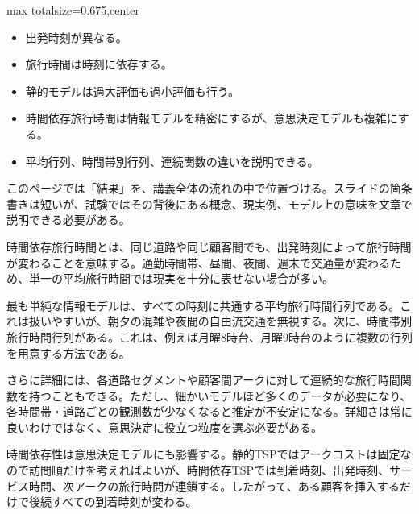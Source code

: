 \clearpage
{}
\begin{adjustbox}{max totalsize={\textwidth}{0.675\textheight},center}
\begin{minipage}{\textwidth}\scriptsize
\begin{minipage}[t]{0.485\textwidth}
\begin{itemize}
\item 出発時刻が異なる。
\item 旅行時間は時刻に依存する。
\item 静的モデルは過大評価も過小評価も行う。
\end{itemize}
\begin{itemize}
\item 時間依存旅行時間は情報モデルを精密にするが、意思決定モデルも複雑にする。
\item 平均行列、時間帯別行列、連続関数の違いを説明できる。
\end{itemize}
\end{minipage}\hfill
\begin{minipage}[t]{0.485\textwidth}
このページでは「結果」を、講義全体の流れの中で位置づける。スライドの箇条書きは短いが、試験ではその背後にある概念、現実例、モデル上の意味を文章で説明できる必要がある。\par
時間依存旅行時間とは、同じ道路や同じ顧客間でも、出発時刻によって旅行時間が変わることを意味する。通勤時間帯、昼間、夜間、週末で交通量が変わるため、単一の平均旅行時間では現実を十分に表せない場合が多い。\par
最も単純な情報モデルは、すべての時刻に共通する平均旅行時間行列である。これは扱いやすいが、朝夕の混雑や夜間の自由流交通を無視する。次に、時間帯別旅行時間行列がある。これは、例えば月曜8時台、月曜9時台のように複数の行列を用意する方法である。\par
さらに詳細には、各道路セグメントや顧客間アークに対して連続的な旅行時間関数を持つこともできる。ただし、細かいモデルほど多くのデータが必要になり、各時間帯・道路ごとの観測数が少なくなると推定が不安定になる。詳細さは常に良いわけではなく、意思決定に役立つ粒度を選ぶ必要がある。\par
時間依存性は意思決定モデルにも影響する。静的TSPではアークコストは固定なので訪問順だけを考えればよいが、時間依存TSPでは到着時刻、出発時刻、サービス時間、次アークの旅行時間が連鎖する。したがって、ある顧客を挿入するだけで後続すべての到着時刻が変わる。\par

\end{minipage}
\end{minipage}
\end{adjustbox}
